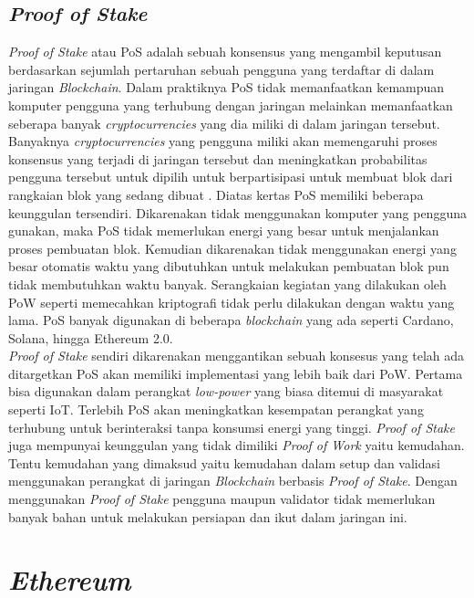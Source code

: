 \subsection{\emph{Proof of Stake}}
\label{subsec:pos}

\emph{Proof of Stake} atau PoS adalah sebuah konsensus yang mengambil keputusan berdasarkan sejumlah pertaruhan sebuah pengguna yang terdaftar di dalam jaringan \emph{Blockchain}. Dalam praktiknya PoS tidak memanfaatkan kemampuan komputer pengguna yang terhubung dengan jaringan melainkan memanfaatkan seberapa banyak \emph{cryptocurrencies} yang dia miliki di dalam jaringan tersebut. Banyaknya \emph{cryptocurrencies} yang pengguna miliki akan memengaruhi proses konsensus yang terjadi di jaringan tersebut dan meningkatkan probabilitas pengguna tersebut untuk dipilih untuk berpartisipasi untuk membuat blok dari rangkaian blok yang sedang dibuat \cite{poscons}. Diatas kertas PoS memiliki beberapa keunggulan tersendiri. Dikarenakan tidak menggunakan komputer yang pengguna gunakan, maka PoS tidak memerlukan energi yang besar untuk menjalankan proses pembuatan blok. Kemudian dikarenakan tidak menggunakan energi yang besar otomatis waktu yang dibutuhkan untuk melakukan pembuatan blok pun tidak membutuhkan waktu banyak. Serangkaian kegiatan yang dilakukan oleh PoW seperti memecahkan kriptografi tidak perlu dilakukan dengan waktu yang lama. PoS banyak digunakan di beberapa \emph{blockchain} yang ada seperti Cardano, Solana, hingga Ethereum 2.0.
\\
\emph{Proof of Stake} sendiri dikarenakan menggantikan sebuah konsesus yang telah ada ditargetkan PoS akan memiliki implementasi yang lebih baik dari PoW. Pertama bisa digunakan dalam perangkat \emph{low-power} yang biasa ditemui di masyarakat seperti IoT. Terlebih PoS akan meningkatkan kesempatan perangkat yang terhubung untuk berinteraksi tanpa konsumsi energi yang tinggi. \emph{Proof of Stake} juga mempunyai keunggulan yang tidak dimiliki \emph{Proof of Work} yaitu kemudahan. Tentu kemudahan yang dimaksud yaitu kemudahan dalam setup dan validasi menggunakan perangkat di jaringan \emph{Blockchain} berbasis \emph{Proof of Stake}. Dengan menggunakan \emph{Proof of Stake} pengguna maupun validator tidak memerlukan banyak bahan untuk melakukan persiapan dan ikut dalam jaringan ini. 

\section{\emph{Ethereum}}
\label{sec:eth}


